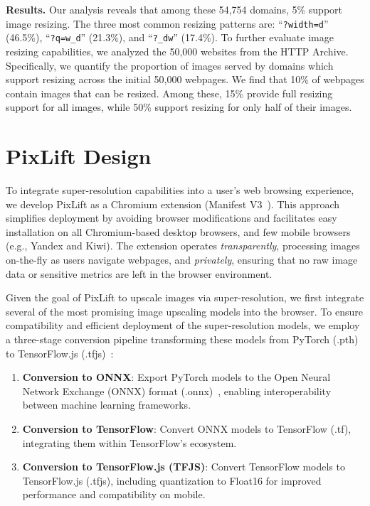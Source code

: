 \documentclass[acmsmall]{acmart}
\newcommand{\tool}{{PixLift}\xspace}
\newcommand{\eg}{{e.g.,}\xspace}
\begin{document}
\vspace{0.05in}
\noindent
\textbf{Results.} Our analysis reveals that among these 54,754 domains, 5\% support image resizing. The three most common resizing patterns are: ``\texttt{?width=d}'' (46.5\%), ``\texttt{?q=w\_d}'' (21.3\%), and ``\texttt{?\_dw}'' (17.4\%). To further evaluate image resizing capabilities, we analyzed the 50,000 websites from the HTTP Archive. Specifically, we quantify the proportion of images served by domains which support resizing across the initial 50,000 webpages. We find that 10\% of webpages contain images that can be resized. Among these, 15\% provide full resizing support for all images, while 50\% support resizing for only half of their images.


\section{\tool Design} 
\label{sec:design} 
To integrate super-resolution capabilities into a user's web browsing experience, we develop \tool as a Chromium extension (Manifest V3~\cite{manifestv3}). This approach simplifies deployment by avoiding browser modifications and facilitates easy installation on all Chromium-based desktop browsers, and few mobile browsers (\eg Yandex and Kiwi). The extension operates \textit{transparently}, processing images on-the-fly as users navigate webpages, and \textit{privately}, ensuring that no raw image data or sensitive metrics are left in the browser environment.

Given the goal of \tool to upscale images via super-resolution, we first integrate several of the most promising image upscaling models into the browser. To ensure compatibility and efficient deployment of the super-resolution models, we employ a three-stage conversion pipeline transforming these models from PyTorch (.pth)~\cite{pytorch} to TensorFlow.js (.tfjs)~\cite{tensorflowjs}:

\begin{enumerate}
    \item \textbf{Conversion to ONNX}: Export PyTorch models to the Open Neural Network Exchange (ONNX) format (.onnx)~\cite{onnx}, enabling interoperability between machine learning frameworks.
    
    \item \textbf{Conversion to TensorFlow}: Convert ONNX models to TensorFlow (.tf), integrating them within TensorFlow's ecosystem.
    
    \item \textbf{Conversion to TensorFlow.js (TFJS)}: Convert TensorFlow models to TensorFlow.js (.tfjs), including quantization to Float16 for improved performance and compatibility on mobile.
\end{enumerate}
\end{document}
